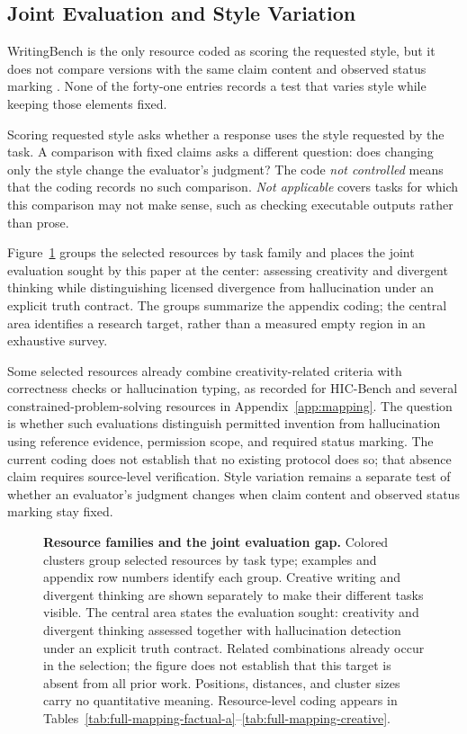 \documentclass{clv2025}
\begin{document}
\subsection{Joint Evaluation and Style Variation}

WritingBench is the only resource coded as scoring the requested style, but
it does not compare versions with the same claim content and observed status marking
\citep{wu_writingbench_2025}. None of the forty-one entries records a test
that varies style while keeping those elements fixed.

Scoring requested style asks whether a response uses the style requested
by the task. A comparison with fixed claims asks a different question:
does changing only the style change the evaluator's judgment? The code
\emph{not controlled} means that the coding records no such comparison.
\emph{Not applicable} covers tasks for which this comparison may not make
sense, such as checking executable outputs rather than prose.

Figure~\ref{fig:profiles} groups the selected resources by task family and
places the joint evaluation sought by this paper at the center: assessing
creativity and divergent thinking while distinguishing licensed divergence
from hallucination under an explicit truth contract. The groups summarize
the appendix coding; the central area identifies a research target, rather
than a measured empty region in an exhaustive survey.

Some selected resources already combine creativity-related criteria with
correctness checks or hallucination typing, as recorded for HIC-Bench and
several constrained-problem-solving resources in Appendix~\ref{app:mapping}.
The question is whether such evaluations distinguish permitted invention
from hallucination using reference evidence, permission scope, and required
status marking. The current coding does not establish that no existing
protocol does so; that absence claim requires source-level verification.
Style variation remains a separate test of whether an evaluator's judgment
changes when claim content and observed status marking stay fixed.

\begin{figure}[!ht]
\centering
\resizebox{\textwidth}{!}{}
\caption{\textbf{Resource families and the joint evaluation gap.}
Colored clusters group selected resources by task type; examples and appendix
row numbers identify each group. Creative writing and divergent thinking
are shown separately to make their different tasks visible.
The central area states the evaluation sought: creativity and divergent
thinking assessed together with hallucination detection under an explicit
truth contract. Related combinations already occur in the selection; the
figure does not establish that this target is absent from all prior work.
Positions, distances, and cluster sizes carry no quantitative meaning.
Resource-level coding appears in
Tables~\ref{tab:full-mapping-factual-a}--\ref{tab:full-mapping-creative}.}
\label{fig:profiles}
\end{figure}
\FloatBarrier
\end{document}
